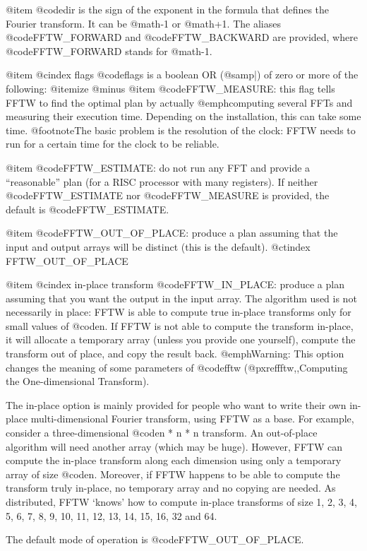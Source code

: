 @item
@code{dir} is the sign of the exponent in the formula that
defines the Fourier transform.  It can be @math{-1} or @math{+1}.
The aliases @code{FFTW_FORWARD} and @code{FFTW_BACKWARD}
are provided, where @code{FFTW_FORWARD} stands for @math{-1}.

@item
@cindex flags
@code{flags} is a boolean OR (@samp{|}) of zero or more of the following:
@itemize @minus
@item
@code{FFTW_MEASURE}: this flag tells FFTW to find the optimal plan by
actually @emph{computing} several FFTs and measuring their
execution time.  Depending on the installation, this can take some
time. @footnote{The basic problem is the resolution of the clock:
FFTW needs to run for a certain time for the clock to be reliable.}

@item
@code{FFTW_ESTIMATE}: do not run any FFT and provide a ``reasonable''
plan (for a RISC processor with many registers).  If neither
@code{FFTW_ESTIMATE} nor @code{FFTW_MEASURE} is provided, the default is
@code{FFTW_ESTIMATE}.

@item
@code{FFTW_OUT_OF_PLACE}: produce a plan assuming that the input and
output arrays will be distinct (this is the default).
@ctindex FFTW_OUT_OF_PLACE

@item
@cindex in-place transform
@code{FFTW_IN_PLACE}: produce a plan assuming that you want the output
in the input array.  The algorithm used is not necessarily in place:
FFTW is able to compute true in-place transforms only for small values
of @code{n}.  If FFTW is not able to compute the transform in-place, it
will allocate a temporary array (unless you provide one yourself),
compute the transform out of place, and copy the result back.
@emph{Warning: This option changes the meaning of some parameters of
@code{fftw}} (@pxref{fftw,,Computing the One-dimensional Transform}).

The in-place option is mainly provided for people who want to write
their own in-place multi-dimensional Fourier transform, using FFTW as a
base.  For example, consider a three-dimensional @code{n * n * n}
transform.  An out-of-place algorithm will need another array (which may
be huge).  However, FFTW can compute the in-place transform along
each dimension using only a temporary array of size @code{n}.
Moreover, if FFTW happens to be able to compute the transform truly
in-place, no temporary array and no copying are needed.  As distributed,
FFTW `knows' how to compute in-place transforms of size 1, 2, 3, 4, 5, 6,
7, 8, 9, 10, 11, 12, 13, 14, 15, 16, 32 and 64.

The default mode of operation is @code{FFTW_OUT_OF_PLACE}.

